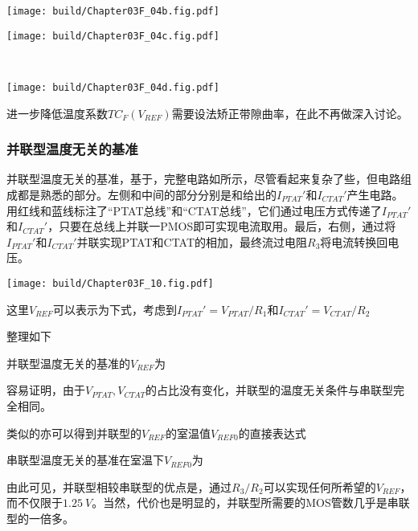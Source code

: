 \begin{Figure}[温度无关的基准]
    \begin{FigureSub}
        \texttt{[image: build/Chapter03F\_04b.fig.pdf]}
    \end{FigureSub}
    \begin{FigureSub}
        \texttt{[image: build/Chapter03F\_04c.fig.pdf]}
    \end{FigureSub}\\ \vspace{0.5cm}
    \begin{FigureSub}
        \texttt{[image: build/Chapter03F\_04d.fig.pdf]}
    \end{FigureSub}
\end{Figure}
进一步降低温度系数$TC_F(V_{REF})$需要设法矫正带隙曲率，在此不再做深入讨论。

\subsubsection{并联型温度无关的基准}
并联型温度无关的基准，基于，完整电路如所示，尽管看起来复杂了些，但电路组成都是熟悉的部分。左侧和中间的部分分别是和给出的$I_{PTAT}'$和$I_{CTAT}'$产生电路。用红线和蓝线标注了“PTAT总线”和“CTAT总线”，它们通过电压方式传递了$I_{PTAT}'$和$I_{CTAT}'$，只要在总线上并联一PMOS即可实现电流取用。最后，右侧，通过将$I_{PTAT}'$和$I_{CTAT}'$并联实现PTAT和CTAT的相加，最终流过电阻$R_3$将电流转换回电压。
\begin{Figure}[并联型温度无关的基准]
    \texttt{[image: build/Chapter03F\_10.fig.pdf]}
\end{Figure}
这里$V_{REF}$可以表示为下式，考虑到$I_{PTAT}'=V_{PTAT}/R_1$和$I_{CTAT}'=V_{CTAT}/R_2$
整理如下
\begin{BoxFormula}[并联型温度无关的基准]
    并联型温度无关的基准的$V_{REF}$为
\end{BoxFormula}
容易证明，由于$V_{PTAT},V_{CTAT}$的占比没有变化，并联型的温度无关条件与串联型完全相同。

类似的亦可以得到并联型的$V_{REF}$的室温值$V_{REF0}$的直接表达式
\begin{BoxFormula}[串联型温度无关的基准的室温值]
    串联型温度无关的基准在室温下$V_{REF0}$为
\end{BoxFormula}
由此可见，并联型相较串联型的优点是，通过$R_3/R_2$可以实现任何所希望的$V_{REF}$，而不仅限于$\SI{1.25}{V}$。当然，代价也是明显的，并联型所需要的MOS管数几乎是串联型的一倍多。